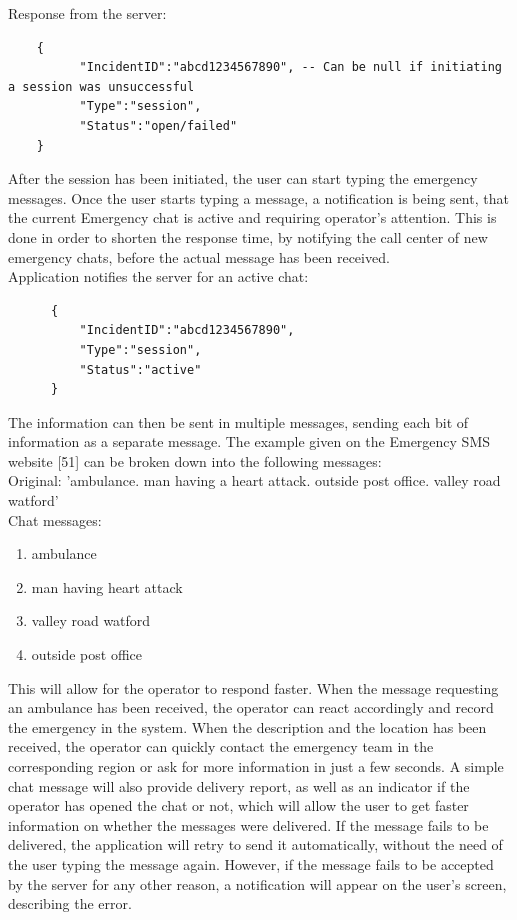 \documentclass{article}
\begin{document}
Response from the server:
\begin{lstlisting}
	{
          "IncidentID":"abcd1234567890", -- Can be null if initiating a session was unsuccessful
          "Type":"session",
          "Status":"open/failed"
	}
\end{lstlisting}
After the session has been initiated, the user can start typing the emergency messages. Once the user starts typing a message, a notification is being sent, that the current Emergency chat is active and requiring operator’s attention. This is done in order to shorten the response time, by notifying the call center of new emergency chats, before the actual message has been received.\\

\pagebreak
Application notifies the server for an active chat:
\begin{lstlisting}
      {
          "IncidentID":"abcd1234567890",
          "Type":"session",
          "Status":"active"
      }
\end{lstlisting}

The information can then be sent in multiple messages, sending each bit of information as a separate message. The example given on the Emergency SMS website [51] can be broken down into the following messages:\\

Original: 'ambulance. man having a heart attack. outside post office. valley road watford'\\

Chat messages:
\begin{enumerate}

\item ambulance
\item man having heart attack
\item valley road watford
\item outside post office

\end{enumerate}
This will allow for the operator to respond faster. When the message requesting an ambulance has been received, the operator can react accordingly and record the emergency in the system. When the description and the location has been received, the operator can quickly contact the emergency team in the corresponding region or ask for more information in just a few seconds. A simple chat message will also provide delivery report, as well as an indicator if the operator has opened the chat or not, which will allow the user to get faster information on whether the messages were delivered. If the message fails to be delivered, the application will retry to send it automatically, without the need of the user typing the message again. However, if the message fails to be accepted by the server for any other reason, a notification will appear on the user’s screen, describing the error.\\
\end{document}
